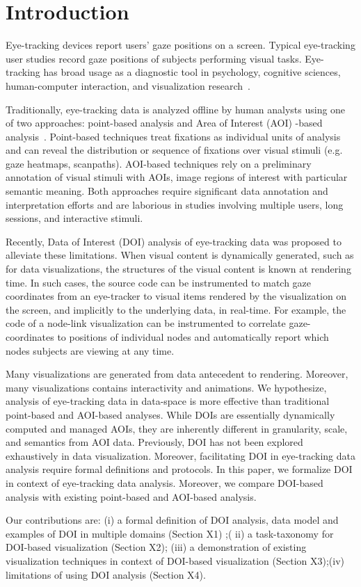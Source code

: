 \section{Introduction}
Eye-tracking devices report users' gaze positions on a screen. Typical eye-tracking user studies record gaze positions of subjects performing visual tasks. Eye-tracking has broad usage as a diagnostic tool in psychology, cognitive sciences, human-computer interaction, and visualization research~\cite{duchowski2002breadth}.

Traditionally, eye-tracking data is analyzed offline by human analysts using one of two approaches: point-based analysis and Area of Interest (AOI) -based analysis~\cite{blascheck2014state}. Point-based techniques treat fixations as individual units of analysis and can reveal the distribution or sequence of fixations over visual stimuli (e.g. gaze heatmaps, scanpaths). AOI-based techniques rely on a preliminary annotation of visual stimuli with AOIs, image regions of interest with particular semantic meaning.  Both approaches require significant data annotation and interpretation efforts and are laborious in studies involving multiple users, long sessions, and interactive stimuli. 

Recently, Data of Interest (DOI) analysis of eye-tracking data was proposed to alleviate these limitations. When visual content is dynamically generated, such as for data visualizations, the structures of the visual content is known at rendering time.  In such cases, the source code can be instrumented to match gaze coordinates from an eye-tracker to visual items rendered by the visualization on the screen, and implicitly to the underlying data, in real-time. For example, the code of a node-link visualization can be instrumented to correlate gaze-coordinates to positions of individual nodes and automatically report which nodes subjects are viewing at any time.  

Many visualizations are generated from data antecedent to rendering. Moreover, many visualizations contains interactivity and animations. We hypothesize, analysis of eye-tracking data in data-space is more effective than traditional point-based and AOI-based analyses. While DOIs are essentially dynamically computed and managed AOIs, they are inherently different in granularity, scale, and semantics from AOI data. Previously, DOI has not been explored exhaustively in data visualization. Moreover, facilitating DOI in eye-tracking data analysis require formal definitions and protocols. In this paper, we formalize DOI in context of eye-tracking data analysis. Moreover, we compare DOI-based analysis with existing point-based and AOI-based analysis.   

Our contributions are: (i) a formal definition of DOI analysis, data model and examples of DOI in multiple domains (Section X1) ;( ii) a task-taxonomy for DOI-based visualization (Section X2); (iii) a demonstration of existing visualization techniques in context of DOI-based visualization (Section X3);(iv) limitations of using DOI analysis (Section X4). 